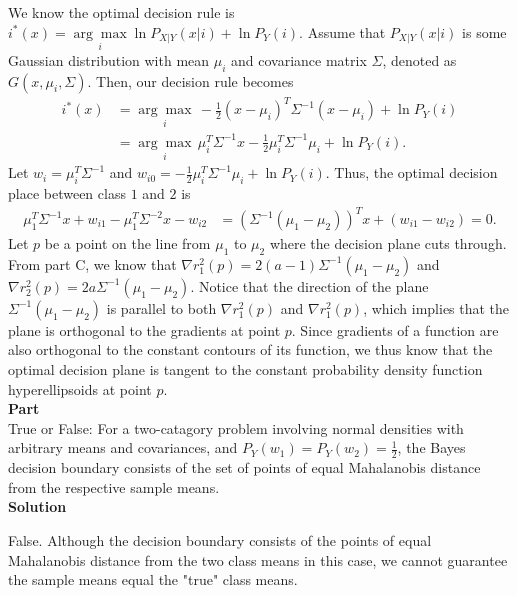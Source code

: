 \documentclass{article}
\newcounter{partCounter}
\renewcommand{\part}[1]{\textbf{\large Part \Alph{partCounter}}\stepcounter{partCounter}\\}
\begin{document}
We know the optimal decision rule is $i^*(x) = \underset{i}{\arg \max} \ln P_{X|Y}(x|i) + \ln P_Y(i)$.
Assume that $P_{X|Y}(x|i)$ is some Gaussian distribution with mean $\mu_i$ and covariance matrix $\Sigma$, denoted as $G(x, \mu_i, \Sigma)$.
Then, our decision rule becomes 
\begin{align*}
  i^*(x) 
  &= \underset{i}{\arg \max} \, -\frac{1}{2}(x - \mu_i)^T\Sigma^{-1}(x - \mu_i) + \ln P_Y(i) \\
  &= \underset{i}{\arg \max} \, \mu_i^T\Sigma^{-1} x - \frac{1}{2}\mu_i^T\Sigma^{-1}\mu_i + \ln P_Y(i).
\end{align*}
Let $w_i = \mu_i^T\Sigma^{-1}$ and $w_{i0} = -\frac{1}{2}\mu_i^T\Sigma^{-1}\mu_i + \ln P_Y(i)$.
Thus, the optimal decision place between class $1$ and $2$ is
\begin{align*}
  \mu_1^T\Sigma^{-1} x + w_{i1} - \mu_1^T\Sigma^{-2} x - w_{i2}
  &= (\Sigma^{-1}(\mu_1 - \mu_2))^T x + (w_{i1} - w_{i2}) = 0.
\end{align*}
Let $p$ be a point on the line from $\mu_1$ to $\mu_2$ where the decision plane cuts through.
From part C, we know that $\nabla r^2_1(p) = 2(a - 1)\Sigma^{-1}(\mu_1 - \mu_2)$ and $\nabla r^2_2(p) = 2a\Sigma^{-1}(\mu_1 - \mu_2)$.
Notice that the direction of the plane $\Sigma^{-1}(\mu_1 - \mu_2)$ is parallel to both $\nabla r^2_1(p)$ and $\nabla r^2_1(p)$, which implies that the plane is orthogonal to the gradients at point $p$.
Since gradients of a function are also orthogonal to the constant contours of its function, we thus know that the optimal decision plane is tangent to the constant probability density function hyperellipsoids at point $p$.
\\

\part{E}

True or False: For a two-catagory problem involving normal densities with arbitrary means and covariances, and $P_Y(w_1) = P_Y(w_2) = \frac{1}{2}$, the Bayes decision boundary consists of the set of points of equal Mahalanobis distance from the respective sample means.
\\

\textbf{Solution}

False. Although the decision boundary consists of the points of equal Mahalanobis distance from the two class means in this case, we cannot guarantee the sample means equal the "true" class means.
\end{document}
